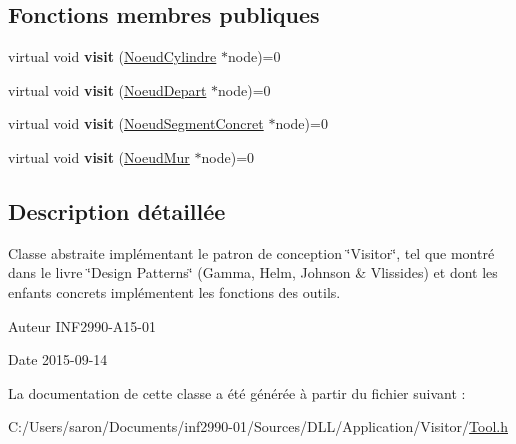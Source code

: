 \subsection*{Fonctions membres publiques}
\begin{DoxyCompactItemize}
\item 
\hypertarget{class_tool_aae0deb2f98f4950c62a72d43f2b5e329}{virtual void {\bfseries visit} (\hyperlink{class_noeud_cylindre}{Noeud\-Cylindre} $\ast$node)=0}\label{class_tool_aae0deb2f98f4950c62a72d43f2b5e329}

\item 
\hypertarget{class_tool_ac2ff46411a7d46e2ee460dd392be2129}{virtual void {\bfseries visit} (\hyperlink{class_noeud_depart}{Noeud\-Depart} $\ast$node)=0}\label{class_tool_ac2ff46411a7d46e2ee460dd392be2129}

\item 
\hypertarget{class_tool_a80ac4596158237b53ec9f54af39f447c}{virtual void {\bfseries visit} (\hyperlink{class_noeud_segment_concret}{Noeud\-Segment\-Concret} $\ast$node)=0}\label{class_tool_a80ac4596158237b53ec9f54af39f447c}

\item 
\hypertarget{class_tool_afadb5dbece885b62cb43db48e8d89408}{virtual void {\bfseries visit} (\hyperlink{class_noeud_mur}{Noeud\-Mur} $\ast$node)=0}\label{class_tool_afadb5dbece885b62cb43db48e8d89408}

\end{DoxyCompactItemize}


\subsection{Description détaillée}
Classe abstraite implémentant le patron de conception \char`\"{}\-Visitor\char`\"{}, tel que montré dans le livre \char`\"{}\-Design Patterns\char`\"{} (Gamma, Helm, Johnson \& Vlissides) et dont les enfants concrets implémentent les fonctions des outils. 

\begin{DoxyAuthor}{Auteur}
I\-N\-F2990-\/\-A15-\/01 
\end{DoxyAuthor}
\begin{DoxyDate}{Date}
2015-\/09-\/14 
\end{DoxyDate}


La documentation de cette classe a été générée à partir du fichier suivant \-:\begin{DoxyCompactItemize}
\item 
C\-:/\-Users/saron/\-Documents/inf2990-\/01/\-Sources/\-D\-L\-L/\-Application/\-Visitor/\hyperlink{_tool_8h}{Tool.\-h}\end{DoxyCompactItemize}
